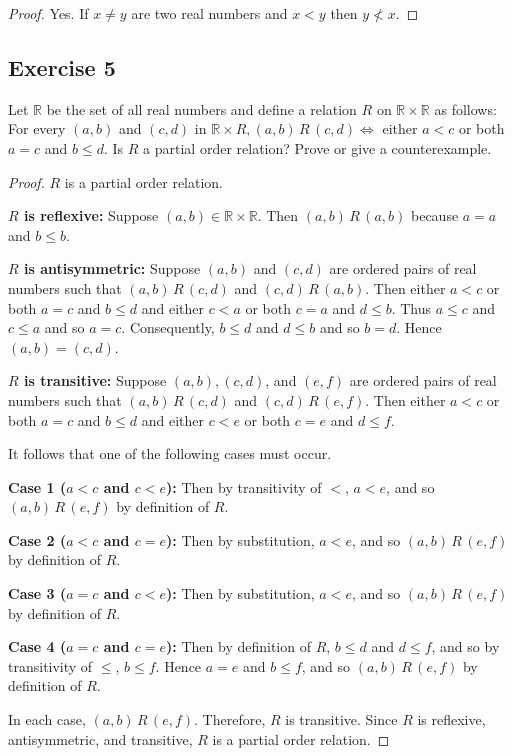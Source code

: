 \documentclass[14pt]{extarticle}
\newcommand{\R}{\mathbb{R}}
\begin{document}
\begin{proof}
Yes. If \(x \neq y\) are two real numbers and \(x < y\) then \(y \nless x\).
\end{proof}

\subsection{Exercise 5}
Let $\R$ be the set of all real numbers and define a relation $R$ on \(\R \times \R\) as follows: For every 
\((a, b)\) and \((c, d)\) in \(\R \times R, (a, b) \,R\, (c, d) \iff\) either \(a < c\) or both \(a = c\) and 
\(b \leq d\). Is $R$ a partial order relation? Prove or give a counterexample.

\begin{proof}
$R$ is a partial order relation.

{\bf $R$ is reflexive:} Suppose \((a, b) \in \R \times \R\). Then \((a, b) \,R\, (a, b)\) because \(a = a\) and 
\(b \leq b\).

{\bf $R$ is antisymmetric:} Suppose \((a, b)\) and \((c, d)\) are ordered pairs of real numbers such that \((a, b) \,R 
\, (c, d)\) and \((c, d) \,R\, (a, b)\). Then either \(a < c\) or both \(a = c\) and \(b \leq d\) and either \(c < a\) 
or both \(c = a\) and \(d \leq b\). Thus \(a \leq c\) and \(c \leq a\) and so \(a = c\). Consequently, \(b \leq d\) 
and \(d \leq b\) and so \(b = d\). Hence \((a, b) = (c, d)\).

{\bf $R$ is transitive:} Suppose \((a, b), (c, d)\), and \((e, f)\) are ordered pairs of real numbers such that 
\((a, b) \,R\, (c, d)\) and \((c, d) \,R\, (e, f)\). Then either \(a < c\) or both \(a = c\) and \(b \leq d\) and 
either \(c < e\) or both \(c = e\) and \(d \leq f\).

It follows that one of the following cases must occur.

{\bf Case 1 (\(a < c\) and \(c < e\)):} Then by transitivity of \(<\), \(a < e\), and so \((a, b) \,R\, 
(e, f)\) by definition of \(R\).

{\bf Case 2 (\(a < c\) and \(c = e\)):} Then by substitution, \(a < e\), and so \((a, b) \,R\, (e, f)\) by 
definition of \(R\).

{\bf Case 3 (\(a = c\) and \(c < e\)):} Then by substitution, \(a < e\), and so \((a, b) \,R\, (e, f)\) by 
definition of \(R\).

{\bf Case 4 (\(a = c\) and \(c = e\)):} Then by definition of \(R\), \(b \leq d\) and \(d \leq f\), and so by 
transitivity of \(\leq\), \(b \leq f\). Hence \(a = e\) and \(b \leq f\), and so \((a, b) \,R\, (e, f)\) by definition 
of \(R\).

In each case, \((a, b) \,R\, (e, f)\). Therefore, \(R\) is transitive. Since \(R\) is reflexive, antisymmetric, and 
transitive, \(R\) is a partial order relation.
\end{proof}
\end{document}
